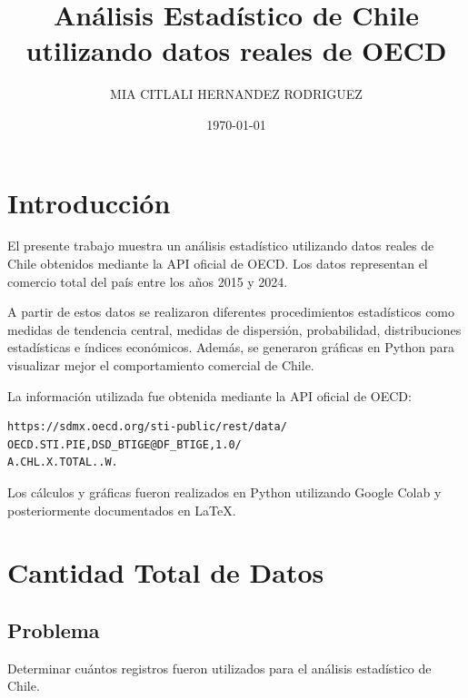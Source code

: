 \documentclass[12pt]{article}
\title{Análisis Estadístico de Chile utilizando datos reales de OECD}
\author{MIA CITLALI HERNANDEZ RODRIGUEZ}
\date{\today}
\begin{document}
\maketitle

\tableofcontents

\newpage


\section{Introducción}

El presente trabajo muestra un análisis estadístico utilizando datos reales de Chile obtenidos mediante la API oficial de OECD. Los datos representan el comercio total del país entre los años 2015 y 2024.

A partir de estos datos se realizaron diferentes procedimientos estadísticos como medidas de tendencia central, medidas de dispersión, probabilidad, distribuciones estadísticas e índices económicos. Además, se generaron gráficas en Python para visualizar mejor el comportamiento comercial de Chile.

La información utilizada fue obtenida mediante la API oficial de OECD:

\begin{verbatim}
https://sdmx.oecd.org/sti-public/rest/data/
OECD.STI.PIE,DSD_BTIGE@DF_BTIGE,1.0/
A.CHL.X.TOTAL..W.
\end{verbatim}

Los cálculos y gráficas fueron realizados en Python utilizando Google Colab y posteriormente documentados en \LaTeX.


\section{Cantidad Total de Datos}

\subsection*{Problema}

Determinar cuántos registros fueron utilizados para el análisis estadístico de Chile.
\end{document}
